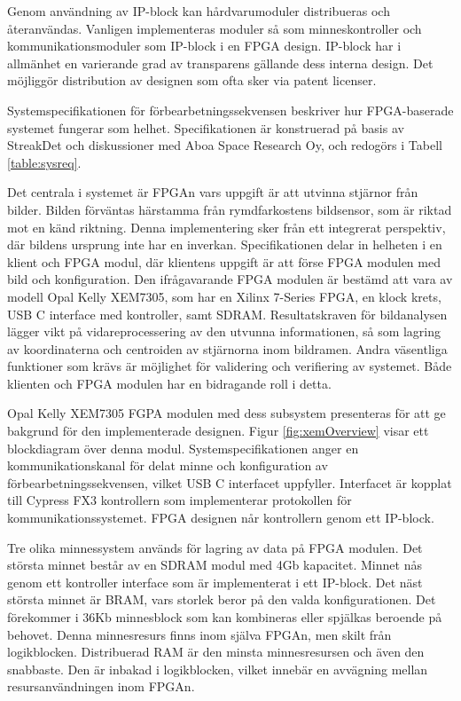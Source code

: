 \documentclass[12pt]{report}
\begin{document}
\par
Genom användning av IP-block kan hårdvarumoduler distribueras och återanvändas. Vanligen implementeras moduler så som minneskontroller och kommunikationsmoduler som IP-block i en FPGA design. IP-block har i allmänhet en varierande grad av transparens gällande dess interna design. Det möjliggör distribution av designen som ofta sker via patent licenser. \citep{XilVivado} \citep{EERefBook}
\par
Systemspecifikationen för förbearbetningssekvensen beskriver hur FPGA-baserade systemet fungerar som helhet. Specifikationen är konstruerad på basis av StreakDet och diskussioner med Aboa Space Research Oy, och redogörs i Tabell \ref{table:sysreq}.
\par
Det centrala i systemet är FPGAn vars uppgift är att utvinna stjärnor från bilder. Bilden förväntas härstamma från rymdfarkostens bildsensor, som är riktad mot en känd riktning. Denna implementering sker från ett integrerat perspektiv, där bildens ursprung inte har en inverkan. Specifikationen delar in helheten i en klient och FPGA modul, där klientens uppgift är att förse FPGA modulen med bild och konfiguration. Den ifrågavarande FPGA modulen är bestämd att vara av modell Opal Kelly XEM7305, som har en Xilinx 7-Series FPGA, en klock krets, USB C interface med kontroller, samt SDRAM. Resultatskraven för bildanalysen lägger vikt på vidareprocessering av den utvunna informationen, så som lagring av koordinaterna och centroiden av stjärnorna inom bildramen. Andra väsentliga funktioner som krävs är möjlighet för validering och verifiering av systemet. Både klienten och FPGA modulen har en bidragande roll i detta.
\par
Opal Kelly XEM7305 FGPA modulen med dess subsystem presenteras för att ge bakgrund för den implementerade designen. Figur \ref{fig:xemOverview} visar ett blockdiagram över denna modul. Systemspecifikationen anger en kommunikationskanal för delat minne och konfiguration av förbearbetningssekvensen, vilket USB C interfacet uppfyller. Interfacet är kopplat till Cypress FX3 kontrollern som implementerar protokollen för kommunikationssystemet. FPGA designen når kontrollern genom ett IP-block. \citep{XEM7305Man}
\par
Tre olika minnessystem används för lagring av data på FPGA modulen. Det största minnet består av en SDRAM modul med 4Gb kapacitet. Minnet nås genom ett kontroller interface som är implementerat i ett IP-block. Det näst största minnet är BRAM, vars storlek beror på den valda konfigurationen. Det förekommer i 36Kb minnesblock som kan kombineras eller spjälkas beroende på behovet. Denna minnesresurs finns inom själva FPGAn, men skilt från logikblocken. Distribuerad RAM är den minsta minnesresursen och även den snabbaste. Den är inbakad i logikblocken, vilket innebär en avvägning mellan resursanvändningen inom FPGAn. \citep{XEM7305Man}
\end{document}
